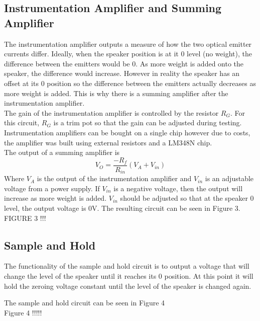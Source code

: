 \documentclass[12pt]{article}
\begin{document}
	\subsection{Instrumentation Amplifier and Summing Amplifier}
	The instrumentation amplifier outputs a measure of how the two optical emitter currents differ. Ideally, when the speaker position is at it 0 level (no weight), the difference between the emitters would be 0. As more weight is added onto the speaker, the difference would increase. However in reality the speaker has an offset at its 0 position so the difference between the emitters actually decreases as more weight is added. This is why there is a summing amplifier after the instrumentation amplifier. \\
	
	The gain of the instrumentation amplifier is controlled by the resistor $R_{G}$. For this circuit, $R_{G}$ is a trim pot so that the gain can be adjusted during testing. \\
	
	Instrumentation amplifiers can be bought on a single chip however due to costs, the amplifier was built using external resistors and a LM348N chip.\\
	
	The output of a summing amplifier is
	$$V_{O} = \frac{-R_{f}}{R_{in}}(V_{A}+V_{in})$$
	Where $V_{A}$ is the output of the instrumentation amplifier and $V_{in}$ is an adjustable voltage from a power supply. If $V_{in}$ is a negative voltage, then the output will increase as more weight is added. $V_{in}$ should be adjusted so that at the speaker 0 level, the output voltage is 0V. The resulting circuit can be seen in Figure 3.\\
	
	FIGURE 3 !!!
	
	\subsection{Sample and Hold}
	The functionality of the sample and hold circuit is to output a voltage that will change the level of the speaker until it reaches its 0 position. At this point it will hold the zeroing voltage constant until the level of the speaker is changed again. 
	
	The sample and hold circuit can be seen in Figure 4\\
	
	Figure 4 !!!!!\\
	
\end{document}
